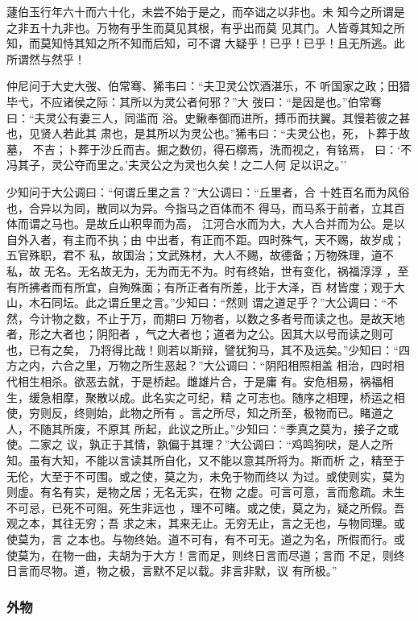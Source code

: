 \documentclass[]{article}
\begin{document}
蘧伯玉行年六十而六十化，未尝不始于是之，而卒诎之以非也。未
知今之所谓是之非五十九非也。万物有乎生而莫见其根，有乎出而莫
见其门。人皆尊其知之所知，而莫知恃其知之所不知而后知，可不谓
大疑乎！已乎！已乎！且无所逃。此所谓然与然乎！

仲尼问于大史大弢、伯常骞、狶韦曰：``夫卫灵公饮酒湛乐，不
听国家之政；田猎毕弋，不应诸侯之际：其所以为灵公者何邪？''大
弢曰：``是因是也。''伯常骞曰：``夫灵公有妻三人，同滥而
浴。史鳅奉御而进所，搏币而扶翼。其慢若彼之甚也，见贤人若此其
肃也，是其所以为灵公也。''狶韦曰：``夫灵公也，死，卜葬于故墓，
不吉；卜葬于沙丘而吉。掘之数仞，得石槨焉，洗而视之，有铭焉，
曰：`不冯其子，灵公夺而里之。'夫灵公之为灵也久矣！之二人何 足以识之。''

少知问于大公调曰：``何谓丘里之言？''大公调曰：``丘里者，合
十姓百名而为风俗也，合异以为同，散同以为异。今指马之百体而不
得马，而马系于前者，立其百体而谓之马也。是故丘山积卑而为高，
江河合水而为大，大人合并而为公。是以自外入者，有主而不执；由
中出者，有正而不距。四时殊气，天不赐，故岁成；五官殊职，君不
私，故国治；文武殊材，大人不赐，故德备；万物殊理，道不私，故
无名。无名故无为，无为而无不为。时有终始，世有变化，祸福淳淳
，至有所拂者而有所宜，自殉殊面；有所正者有所差，比于大泽，百
材皆度；观于大山，木石同坛。此之谓丘里之言。''少知曰：``然则
谓之道足乎？''大公调曰：``不然，今计物之数，不止于万，而期曰
万物者，以数之多者号而读之也。是故天地者，形之大者也；阴阳者
，气之大者也；道者为之公。因其大以号而读之则可也，已有之矣，
乃将得比哉！则若以斯辩，譬犹狗马，其不及远矣。''少知曰：``四
方之内，六合之里，万物之所生恶起？''大公调曰：``阴阳相照相盖
相治，四时相代相生相杀。欲恶去就，于是桥起。雌雄片合，于是庸
有。安危相易，祸福相生，缓急相摩，聚散以成。此名实之可纪，精
之可志也。随序之相理，桥运之相使，穷则反，终则始，此物之所有
。言之所尽，知之所至，极物而已。睹道之人，不随其所废，不原其
所起，此议之所止。''少知曰：``季真之莫为，接子之或使。二家之
议，孰正于其情，孰偏于其理？''大公调曰：``鸡鸣狗吠，是人之所
知。虽有大知，不能以言读其所自化，又不能以意其所将为。斯而析
之，精至于无伦，大至于不可围。或之使，莫之为，未免于物而终以
为过。或使则实，莫为则虚。有名有实，是物之居；无名无实，在物
之虚。可言可意，言而愈疏。未生不可忌，已死不可阻。死生非远也
，理不可睹。或之使，莫之为，疑之所假。吾观之本，其往无穷；吾
求之末，其来无止。无穷无止，言之无也，与物同理。或使莫为，言
之本也。与物终始。道不可有，有不可无。道之为名，所假而行。或
使莫为，在物一曲，夫胡为于大方！言而足，则终日言而尽道；言而
不足，则终日言而尽物。道，物之极，言默不足以载。非言非默，议 有所极。''

\hypertarget{header-n2334}{%
\subsubsection{外物}\label{header-n2334}}
\end{document}
